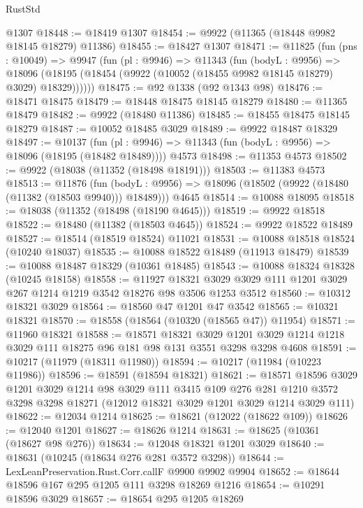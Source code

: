 \begin{lexlean}{RustStd}
\begin{coremodule}
    @1307
@18448 := @18419 @1307
@18454 := @9922 (@11365 (@18448 @9982 @18145 @18279) @11386)
@18455 := @18427 @1307
@18471 := @11825
    (fun (pns : @10049) =>
    @9947
      (fun (pl : @9946) =>
      @11343
        (fun (bodyL : @9956) =>
        @18096 (@18195 (@18454 (@9922 (@10052 (@18455 @9982 @18145 @18279) @3029) @18329))))))
@18475 := @92 @1338 (@92 @1343 @98)
@18476 := @18471 @18475
@18479 := @18448 @18475 @18145 @18279
@18480 := @11365 @18479
@18482 := @9922 (@18480 @11386)
@18485 := @18455 @18475 @18145 @18279
@18487 := @10052 @18485 @3029
@18489 := @9922 @18487 @18329
@18497 := @10137
    (fun (pl : @9946) => @11343 (fun (bodyL : @9956) => @18096 (@18195 (@18482 @18489))))
    @4573
@18498 := @11353 @4573
@18502 := @9922 (@18038 (@11352 (@18498 @18191)))
@18503 := @11383 @4573
@18513 := @11876
    (fun (bodyL : @9956) => @18096 (@18502 (@9922 (@18480 (@11382 (@18503 @9940))) @18489)))
    @4645
@18514 := @10088 @18095
@18518 := @18038 (@11352 (@18498 (@18190 @4645)))
@18519 := @9922 @18518
@18522 := @18480 (@11382 (@18503 @4645))
@18524 := @9922 @18522 @18489
@18527 := @18514 (@18519 @18524) @11021
@18531 := @10088 @18518 @18524 (@10240 @18037)
@18535 := @10088 @18522 @18489 (@11913 @18479)
@18539 := @10088 @18487 @18329 (@10361 @18485)
@18543 := @10088 @18324 @18328 (@10245 @18158)
@18558 := @11927
    @18321
    @3029
    @3029
    @111
    @1201
    @3029
    @267
    @1214
    @1219
    @3542
    @18276
    @98
    @3506
    @1253
    @3512
@18560 := @10312 @18321 @3029
@18564 := @18560 @47 @1201 @47 @3542
@18565 := @10321 @18321
@18570 := @18558 (@18564 (@10320 (@18565 @47)) @11954)
@18571 := @11960 @18321
@18588 := @18571
    @18321
    @3029
    @1201
    @3029
    @1214
    @1218
    @3029
    @111
    @18275
    @96
    @181
    @98
    @131
    @3551
    @3298
    @3298
    @4608
@18591 := @10217 (@11979 (@18311 @11980))
@18594 := @10217 (@11984 (@10223 @11986))
@18596 := @18591 (@18594 @18321)
@18621 := @18571
    @18596
    @3029
    @1201
    @3029
    @1214
    @98
    @3029
    @111
    @3415
    @109
    @276
    @281
    @1210
    @3572
    @3298
    @3298
    @18271
    (@12012 @18321 @3029 @1201 @3029 @1214 @3029 @111)
@18622 := @12034 @1214
@18625 := @18621 (@12022 (@18622 @109))
@18626 := @12040 @1201
@18627 := @18626 @1214
@18631 := @18625 (@10361 (@18627 @98 @276))
@18634 := @12048 @18321 @1201 @3029
@18640 := @18631 (@10245 (@18634 @276 @281 @3572 @3298))
@18644 := LexLeanPreservation.Rust.Corr.callF @9900 @9902 @9904
@18652 := @18644 @18596 @167 @295 @1205 @111 @3298 @18269 @1216
@18654 := @10291 @18596 @3029
@18657 := @18654 @295 @1205 @18269

\end{coremodule}
\end{lexlean}

